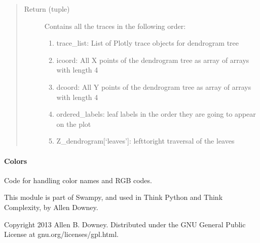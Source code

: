 \documentclass[letterpaper,10pt,english]{sphinxmanual}
\begin{document}
\begin{fulllineitems}
\begin{fulllineitems}
\begin{quote}
\begin{description}
\begin{itemize}
\end{itemize}

\item[{Return (tuple)}] \leavevmode
Contains all the traces in the following order:
\begin{enumerate}
%
\item {} 
trace\_list: List of Plotly trace objects for dendrogram tree

\item {} 
icoord: All X points of the dendrogram tree as array of arrays with length 4

\item {} 
dcoord: All Y points of the dendrogram tree as array of arrays with length 4

\item {} 
ordered\_labels: leaf labels in the order they are going to appear on the plot

\item {} 
Z\_dendrogram{[}‘leaves’{]}: left\sphinxhyphen{}to\sphinxhyphen{}right traversal of the leaves

\end{enumerate}

\end{description}\end{quote}

\end{fulllineitems}


\end{fulllineitems}



\paragraph{Colors}
\label{\detokenize{_autosummary/analytics_core.viz:module-analytics_core.viz.color_list}}\label{\detokenize{_autosummary/analytics_core.viz:colors}}
Code for handling color names and RGB codes.

This module is part of Swampy, and used in Think Python and
Think Complexity, by Allen Downey.


Copyright 2013 Allen B. Downey.
Distributed under the GNU General Public License at gnu.org/licenses/gpl.html.
\end{document}
